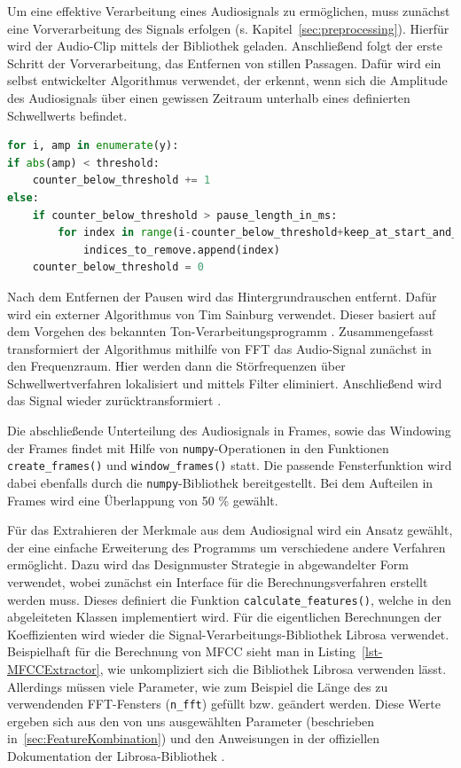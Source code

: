 \textauthor{\vJB}{}{}

Um eine effektive Verarbeitung eines Audiosignals zu ermöglichen, muss zunächst eine Vorverarbeitung des Signals erfolgen (s. Kapitel~\ref{sec:preprocessing}).
Hierfür wird der Audio-Clip mittels der Bibliothek  geladen.
Anschließend folgt der erste Schritt der Vorverarbeitung, das Entfernen von stillen Passagen.
Dafür wird ein selbst entwickelter Algorithmus verwendet, der erkennt, wenn sich die Amplitude des Audiosignals über einen gewissen Zeitraum unterhalb eines definierten Schwellwerts befindet.

\begin{lstlisting}[language=Python,caption=Remove Silence,label=lst-remove-silence]
for i, amp in enumerate(y):
if abs(amp) < threshold:
    counter_below_threshold += 1
else:
    if counter_below_threshold > pause_length_in_ms:
        for index in range(i-counter_below_threshold+keep_at_start_and_end, i-keep_at_start_and_end):
            indices_to_remove.append(index)
    counter_below_threshold = 0
\end{lstlisting}

Nach dem Entfernen der Pausen wird das Hintergrundrauschen entfernt.
Dafür wird ein externer Algorithmus von Tim Sainburg verwendet.
Dieser basiert auf dem Vorgehen des bekannten Ton-Verarbeitungsprogramm .
Zusammengefasst transformiert der Algorithmus mithilfe von \ac{FFT} das Audio-Signal zunächst in den Frequenzraum.
Hier werden dann die Störfrequenzen über Schwellwertverfahren lokalisiert und mittels Filter eliminiert.
Anschließend wird das Signal wieder zurücktransformiert \autocite[][]{sainburg_timsainbnoisereduce_2019}.

Die abschließende Unterteilung des Audiosignals in Frames, sowie das Windowing der Frames findet mit Hilfe von \texttt{numpy}-Operationen in den Funktionen \texttt{create\_\-frames()} und \texttt{window\_\-frames()} statt.
Die passende Fensterfunktion wird dabei ebenfalls durch die \texttt{numpy}-Bibliothek bereitgestellt.
Bei dem Aufteilen in Frames wird eine Überlappung von 50 \% gewählt.

Für das Extrahieren der Merkmale aus dem Audiosignal wird ein Ansatz gewählt, der eine einfache Erweiterung des Programms um verschiedene andere Verfahren ermöglicht.
Dazu wird das Designmuster Strategie in abgewandelter Form verwendet, wobei zunächst ein Interface für die Berechnungsverfahren erstellt werden muss.
Dieses definiert die Funktion \texttt{calculate\_features()}, welche in den abgeleiteten Klassen implementiert wird.
Für die eigentlichen Berechnungen der Koeffizienten wird wieder die Signal-Verarbeitungs-Bibliothek Librosa verwendet.
Beispielhaft für die Berechnung von \ac{MFCC} sieht man in Listing~\ref{lst-MFCCExtractor}, wie unkompliziert sich die Bibliothek Librosa verwenden lässt.
Allerdings müssen viele Parameter, wie zum Beispiel die Länge des zu verwendenden FFT-Fensters (\texttt{n\_fft}) gefüllt bzw. geändert werden.
Diese Werte ergeben sich aus den von uns ausgewählten Parameter (beschrieben in~\ref{sec:FeatureKombination}) und den Anweisungen in der offiziellen Dokumentation der Librosa-Bibliothek \autocite[vgl. ][]{librosa_development_team_librosa_2023}.


